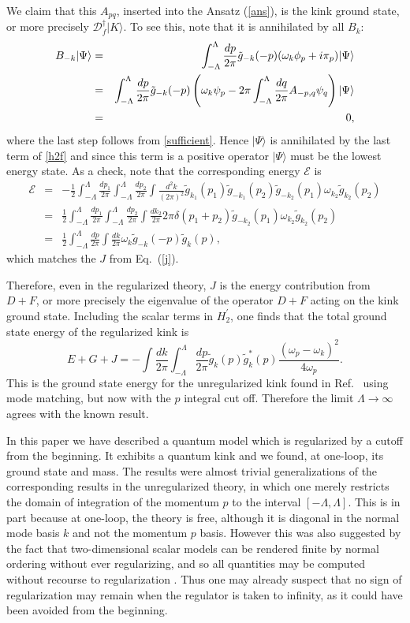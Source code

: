 \def\letter{0}\def\pr{0}\documentclass[a4paper,12pt, epsfig]{article}
\makeatletter
\renewcommand{\(}{\begin{equation}}
\renewcommand{\)}{end{equation} \vspace{-.05in}\linebreak}
\renewcommand{\=}{\hspace{-.03in}=\hspace{-.02in}}
\renewcommand{\(}{\begin{equation}}
\renewcommand{\)}{\end{equation}}
\newcommand{\p}{^\prime}
\renewcommand{\(}{\begin{equation}}
\renewcommand{\)}{\end{equation}}
\def\lpin#1{\int^\Lambda_{-\Lambda} \frac{d#1}{2\pi}}
\def\pin#1{\int \frac{d#1}{2\pi}}
\def\pink#1{\int \frac{d^{#1}k}{(2\pi)^{#1}}}
\def\df{\mathcal{D}_f}
\newcommand{\beq}{\begin{equation}}
\newcommand{\eeq}{\end{equation}}
\newcommand{\bea}{\begin{eqnarray}}
\newcommand{\eea}{\end{eqnarray}}
\def\section{\@startsection{section}{1}{\z@}{3.5ex plus 1ex minus  .2ex}{2.3ex plus .2ex}{\large\bf}}
\makeatother
\begin{document}
We claim that this $A_{pq}$, inserted into the Ansatz (\ref{ans}), is the kink ground state, or more precisely $\df^\dag|K\rangle$.  To see this, note that it is annihilated by all $B_{k}$:
\bea
B_{-k} |\Psi \rangle &=& \int_{-\Lambda}^{\Lambda} \frac{dp}{2\pi} \tilde{g}_{-k}(-p) (\omega_k \phi_p + i \pi_p ) |\Psi \rangle \cr
& = & \int_{-\Lambda}^{\Lambda} \frac{dp}{2\pi} \tilde{g}_{-k}(-p) \left( \omega_k \psi_p - 2\pi \int_{-\Lambda}^{\Lambda} \frac{dq}{2\pi} A_{-p,q} \psi_q \right) |\Psi \rangle  \cr
&=& 0,
\eea
%
where the last step follows from \eqref{sufficient}.  Hence $|\Psi\rangle$ is annihilated by the last term of \eqref{h2f} and since this term is a positive operator $|\Psi\rangle$ must be the lowest energy state.  As a check, note that the corresponding energy $\mathcal{E}$ is
\bea
\nonumber
\mathcal{E}&=&-\frac{1}{2}\lpin{p_1}\lpin{p_2}\pink{2}\tilde{g}_{k_1}(p_1)\tilde{g}_{-k_1}(p_2)\tilde{g}_{-k_2}(p_1)\omega_{k_2}\tilde{g}_{k_2}(p_2)\nonumber\\
&=&\frac{1}{2}\lpin{p_1}\lpin{p_2}\pin{k_2}2\pi\delta(p_1+p_2)\tilde{g}_{-k_2}(p_1)\omega_{k_2}\tilde{g}_{k_2}(p_2)\nonumber\\
&=&\frac{1}{2}\lpin{p}\pin{k}\omega_k\tilde{g}_{-k}(-p)\tilde{g}_{k}(p),
\eea
which matches the $J$ from Eq.~(\ref{j}).

Therefore, even in the regularized theory, $J$ is the energy contribution from $D+F$, or more precisely the eigenvalue of the operator $D+F$ acting on the kink ground state.  Including the scalar terms in $H\p_2$, one finds that the total ground state energy of the regularized kink is
\beq
E+G+J=-\pin{k}\lpin{p} \tilde{g}_k(p)\tilde{g}^*_k(p) \frac{\left(\omega_{p}-\omega_k\right)^2}{4\omega_p}.
\eeq
This is the ground state energy for the unregularized kink found in Ref.~\cite{cahill76} using mode matching, but now with the $p$ integral cut off.  Therefore the limit $\Lambda\rightarrow\infty$ agrees with the known result.





\section{Remarks}

In this paper we have described a quantum model which is regularized by a cutoff from the beginning.  It exhibits a quantum kink and we found, at one-loop, its ground state and mass.  The results were almost trivial generalizations of the corresponding results in the unregularized theory, in which one merely restricts the domain of integration of the momentum $p$ to the interval $[-\Lambda,\Lambda]$.  This is in part because at one-loop, the theory is free, although it is diagonal in the normal mode basis $k$ and not the momentum $p$ basis.  However this was also suggested by the fact that two-dimensional scalar models can be  rendered finite by normal ordering without ever regularizing, and so all quantities may be computed without recourse to regularization \cite{rajaraman,mekink}.  Thus one may already suspect that no sign of regularization may remain when the regulator is taken to infinity, as it could have been avoided from the beginning.
\end{document}
